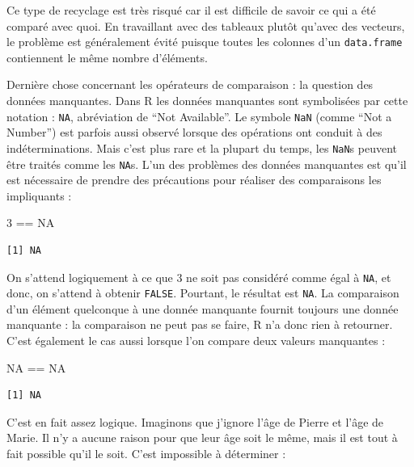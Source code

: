 \documentclass[
  a4paper,
]{article}
\newenvironment{Shaded}{\begin{snugshade}}{\end{snugshade}}
\newcommand{\DecValTok}[1]{\textcolor[rgb]{0.69,0.50,0.00}{#1}}
\newcommand{\OperatorTok}[1]{\textcolor[rgb]{0.12,0.11,0.11}{#1}}
\newcommand{\OtherTok}[1]{\textcolor[rgb]{0.00,0.43,0.16}{#1}}
\newcommand{\StringTok}[1]{\textcolor[rgb]{0.75,0.01,0.01}{#1}}
\begin{document}
Ce type de recyclage est très risqué car il est difficile de savoir ce qui a été comparé avec quoi. En travaillant avec des tableaux plutôt qu'avec des vecteurs, le problème est généralement évité puisque toutes les colonnes d'un \texttt{data.frame} contiennent le même nombre d'éléments.

Dernière chose concernant les opérateurs de comparaison : la question des données manquantes. Dans R les données manquantes sont symbolisées par cette notation : \texttt{NA}, abréviation de ``Not Available''. Le symbole \texttt{NaN} (comme ``Not a Number'') est parfois aussi observé lorsque des opérations ont conduit à des indéterminations. Mais c'est plus rare et la plupart du temps, les \texttt{NaN}s peuvent être traités comme les \texttt{NA}s. L'un des problèmes des données manquantes est qu'il est nécessaire de prendre des précautions pour réaliser des comparaisons les impliquants :

\begin{Shaded}
\begin{Highlighting}[]
\DecValTok{3} \OperatorTok{==}\StringTok{ }\OtherTok{NA}
\end{Highlighting}
\end{Shaded}

\begin{verbatim}
[1] NA
\end{verbatim}

On s'attend logiquement à ce que 3 ne soit pas considéré comme égal à \texttt{NA}, et donc, on s'attend à obtenir \texttt{FALSE}. Pourtant, le résultat est \texttt{NA}. La comparaison d'un élément quelconque à une donnée manquante fournit toujours une donnée manquante : la comparaison ne peut pas se faire, R n'a donc rien à retourner. C'est également le cas aussi lorsque l'on compare deux valeurs manquantes :

\begin{Shaded}
\begin{Highlighting}[]
\OtherTok{NA} \OperatorTok{==}\StringTok{ }\OtherTok{NA}
\end{Highlighting}
\end{Shaded}

\begin{verbatim}
[1] NA
\end{verbatim}

C'est en fait assez logique. Imaginons que j'ignore l'âge de Pierre et l'âge de Marie. Il n'y a aucune raison pour que leur âge soit le même, mais il est tout à fait possible qu'il le soit. C'est impossible à déterminer :
\end{document}
